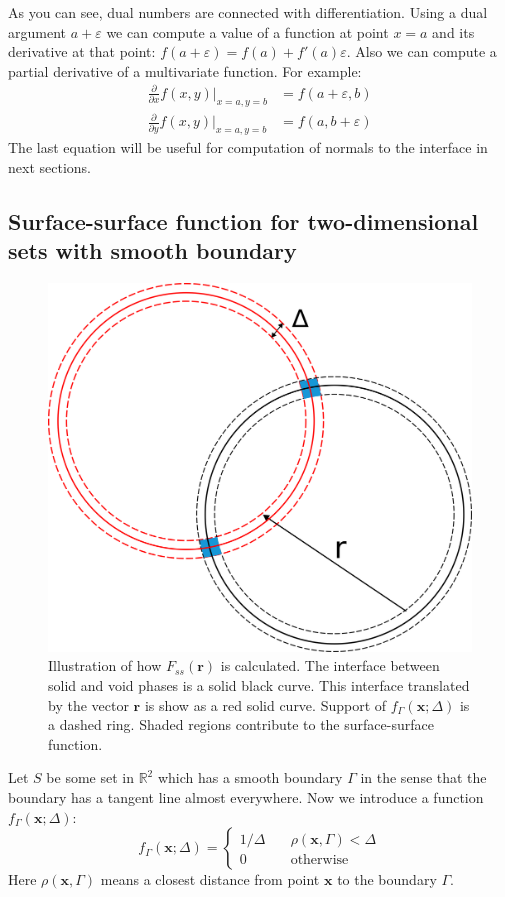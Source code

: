 \documentclass[reprint,amsmath,amssymb,aps,pre,showkeys,showpacs]{revtex4-1}
\begin{document}
As you can see, dual numbers are connected with differentiation. Using a dual
argument $a + \varepsilon$ we can compute a value of a function at point $x = a$
and its derivative at that point:
$f(a + \varepsilon) = f(a) + f'(a)\varepsilon$. Also we can compute a partial
derivative of a multivariate function. For example:
\begin{equation}
  \begin{aligned}
    \frac{\partial}{\partial x} f(x, y) \vert_{x = a, y = b} &= f(a + \varepsilon,
    b) \\
    \frac{\partial}{\partial y} f(x, y) \vert_{x = a, y = b} &= f(a, b +
    \varepsilon)
  \end{aligned}
  \label{eq:autonormals}
\end{equation}
The last equation will be useful for computation of normals to the interface in
next sections.

\subsection{Surface-surface function for two-dimensional sets with smooth boundary}
\label{sec:fss-2d}
\begin{figure}
  \centering
  \includegraphics[width=0.8\linewidth]{images/Fss.png}
  \caption[]{Illustration of how $F_{ss}(\bm{r})$ is calculated. The interface
    between solid and void phases is a solid black curve. This interface
    translated by the vector $\bm{r}$ is show as a red solid curve. Support of
    $f_\Gamma(\bm{x}; \Delta)$ is a dashed ring. Shaded regions contribute to
    the surface-surface function.}
  \label{fig:Fss-explained}
\end{figure}
Let $S$ be some set in $\mathbb{R}^2$ which has a smooth boundary $\Gamma$ in
the sense that the boundary has a tangent line almost everywhere. Now we
introduce a function $f_\Gamma(\bm{x}; \Delta)$:
\begin{equation*}
  f_\Gamma(\bm{x}; \Delta) = \left\{
  \begin{array}{ll}
    1/\Delta & \quad \rho(\bm{x}, \Gamma) < \Delta \\
    0 & \quad \text{otherwise}
  \end{array}
  \right.
\end{equation*}
Here $\rho(\bm{x}, \Gamma)$ means a closest distance from point $\bm{x}$ to the
boundary $\Gamma$.
\end{document}

